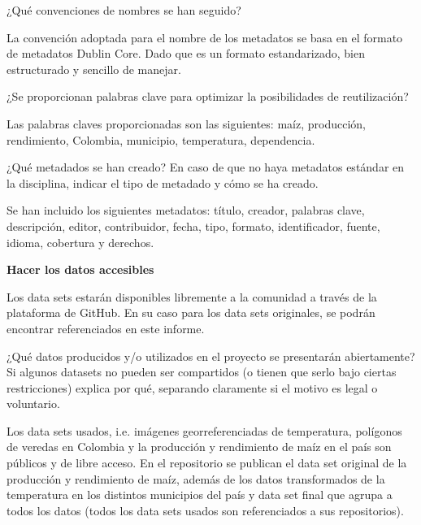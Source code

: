 \documentclass[12pt, spanish]{article}
\begin{document}
\begin{shaded}
¿Qué convenciones de nombres se han seguido?
\end{shaded}

La convención adoptada para el nombre de los metadatos se basa en el formato de metadatos Dublin Core. Dado que es un formato estandarizado, bien estructurado y sencillo de manejar.
\begin{shaded}
¿Se proporcionan palabras clave para optimizar la posibilidades de reutilización?
\end{shaded}
Las palabras claves proporcionadas son las siguientes: maíz, producción, rendimiento, Colombia, municipio, temperatura, dependencia.

\begin{shaded}
¿Qué metadados se han creado? En caso de que no haya metadatos estándar en la disciplina, indicar el tipo de metadado y cómo se ha creado.
\end{shaded}
Se han incluido los siguientes metadatos: título, creador, palabras clave, descripción, editor, contribuidor, fecha, tipo, formato, identificador, fuente, idioma, cobertura y derechos.




\textbf{Hacer los datos accesibles}

Los data sets estarán disponibles libremente a la comunidad a través de la plataforma de GitHub. En su caso para los data sets originales, se podrán encontrar referenciados en este informe.

\begin{shaded}
¿Qué datos producidos y/o utilizados en el proyecto se presentarán abiertamente? Si algunos datasets no pueden ser compartidos (o tienen que serlo bajo ciertas restricciones) explica por qué, separando claramente si el motivo es legal o voluntario. 
\end{shaded}
Los data sets usados, i.e. imágenes georreferenciadas de temperatura, polígonos de veredas en Colombia y la producción y rendimiento de maíz en el país son públicos y de libre acceso. En el repositorio se publican el data set original de la producción y rendimiento de maíz, además de los datos transformados de la temperatura en los distintos municipios del país y data set final que agrupa a todos los datos (todos los data sets usados son referenciados a sus repositorios).\\
\end{document}
